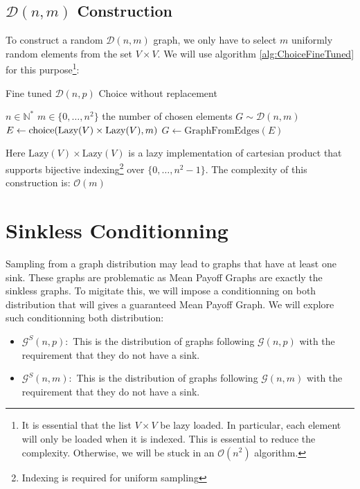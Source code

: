\subsection{$\mathcal{D}(n,m)$ Construction}
To construct a random $\mathcal{D}(n,m)$ graph, we only have to select $m$ uniformly random elements from the set $V\times V.$
\newline We will use algorithm \ref{alg:ChoiceFineTuned} for this purpose\footnote{It is essential that the list $V\times V$ be lazy loaded. In particular, each element will only be loaded when it is indexed. This is essential to reduce the complexity. Otherwise, we will be stuck in an $\mathcal{O}(n^2)$ algorithm.}:
\begin{algorithm}
	\caption{Fine tuned $\mathcal{D}(n,p)$ Choice without replacement }\label{Dnm} 
	\begin{algorithmic}
		\Require $n\in\mathbb{N}^*$
		\Require $m\in\{0,\dots,n^2\}$ the number of chosen elements
		\Ensure $G\sim \mathcal{D}(n,m)$
		\State $E\leftarrow \operatorname{choice}(\text{Lazy}(V)\times \text{Lazy}(V),m)$ 
		\State \Return $G\leftarrow \text{GraphFromEdges}(E)$
	\end{algorithmic}
\end{algorithm}
\FloatBarrier
Here $\text{Lazy}(V)\times \text{Lazy}(V)$ is a lazy implementation of cartesian product that supports bijective indexing\footnote{Indexing is required for uniform sampling} over $\{0,\dots,n^2-1\}.$
\newline The complexity of this construction is: $
\mathcal{O}(m)
$ 

\section{Sinkless Conditionning}
Sampling from a graph distribution may lead to graphs that have at least one sink. 
\newline These graphs are problematic as Mean Payoff Graphs are exactly the sinkless graphs.
\newline To migitate this, we will impose a conditionning on both distribution that will gives a guaranteed Mean Payoff Graph.
\newline We will explore such conditionning both distribution:
\begin{itemize}
	\item $\mathcal{G}^S(n,p):$ This is the distribution of graphs following $\mathcal{G}(n,p)$ with the requirement that they do not have a sink.
	\item $\mathcal{G}^S(n,m):$ This is the distribution of graphs following $\mathcal{G}(n,m)$ with the requirement that they do not have a sink.
\end{itemize}
